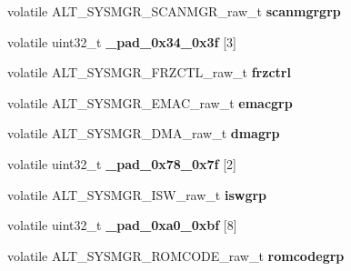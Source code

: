 \begin{DoxyCompactItemize}
\item 
\mbox{\label{structALT__SYSMGR__raw__s_ae844d053ce95ecd0df127b1335f84051}} 
volatile A\+L\+T\+\_\+\+S\+Y\+S\+M\+G\+R\+\_\+\+S\+C\+A\+N\+M\+G\+R\+\_\+raw\+\_\+t {\bfseries scanmgrgrp}
\item 
\mbox{\label{structALT__SYSMGR__raw__s_ac180f398abf4cc36f89702936e339bfe}} 
volatile uint32\+\_\+t {\bfseries \+\_\+pad\+\_\+0x34\+\_\+0x3f} \mbox{[}3\mbox{]}
\item 
\mbox{\label{structALT__SYSMGR__raw__s_ae071d7cf8ec99fd762c42fc8573ccabc}} 
volatile A\+L\+T\+\_\+\+S\+Y\+S\+M\+G\+R\+\_\+\+F\+R\+Z\+C\+T\+L\+\_\+raw\+\_\+t {\bfseries frzctrl}
\item 
\mbox{\label{structALT__SYSMGR__raw__s_ae66e2fa4444b8ce2fddd8fcc403ad49c}} 
volatile A\+L\+T\+\_\+\+S\+Y\+S\+M\+G\+R\+\_\+\+E\+M\+A\+C\+\_\+raw\+\_\+t {\bfseries emacgrp}
\item 
\mbox{\label{structALT__SYSMGR__raw__s_afcfbf9216bd026ba84538d2b170c2a57}} 
volatile A\+L\+T\+\_\+\+S\+Y\+S\+M\+G\+R\+\_\+\+D\+M\+A\+\_\+raw\+\_\+t {\bfseries dmagrp}
\item 
\mbox{\label{structALT__SYSMGR__raw__s_a122247f43ca20f3cb5d48be9488a5054}} 
volatile uint32\+\_\+t {\bfseries \+\_\+pad\+\_\+0x78\+\_\+0x7f} \mbox{[}2\mbox{]}
\item 
\mbox{\label{structALT__SYSMGR__raw__s_ae043f013707517780c840d614b08276b}} 
volatile A\+L\+T\+\_\+\+S\+Y\+S\+M\+G\+R\+\_\+\+I\+S\+W\+\_\+raw\+\_\+t {\bfseries iswgrp}
\item 
\mbox{\label{structALT__SYSMGR__raw__s_a3e5bb668569f89f99f40c4c102e91a01}} 
volatile uint32\+\_\+t {\bfseries \+\_\+pad\+\_\+0xa0\+\_\+0xbf} \mbox{[}8\mbox{]}
\item 
\mbox{\label{structALT__SYSMGR__raw__s_ae53ef5b2b94212548acd2e680bba10df}} 
volatile A\+L\+T\+\_\+\+S\+Y\+S\+M\+G\+R\+\_\+\+R\+O\+M\+C\+O\+D\+E\+\_\+raw\+\_\+t {\bfseries romcodegrp}

\end{DoxyCompactItemize}
